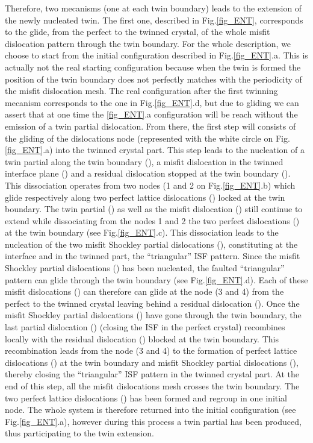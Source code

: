 \documentclass[final,3p,times,twocolumn]{elsarticle}
\begin{document}
Therefore, two mecanisms (one at each twin boundary) leads to the extension of the newly nucleated twin. The first one, described in Fig.\ref{fig_ENT}, corresponds to the glide, from the perfect to the twinned crystal, of the whole misfit dislocation pattern through the twin boundary. For the whole description, we choose to start from the initial configuration described in Fig.\ref{fig_ENT}.a. This is actually not the real starting configuration because when the twin is formed the position of the twin boundary does not perfectly matches with the periodicity of the misfit dislocation mesh. The real configuration after the first twinning mecanism corresponds to the one in Fig.\ref{fig_ENT}.d, but due to gliding we can assert that at one time the \ref{fig_ENT}.a configuration will be reach without the emission of a twin partial dislocation. From there, the first step will consists of the gliding of the dislocations node (represented with the white circle on Fig.\ref{fig_ENT}.a) into the twinned crystal part. This step leads to the nucleation of a twin partial along the twin boundary (), a misfit dislocation in the twinned interface plane () and a residual dislocation stopped at the twin boundary (). This dissociation operates from two nodes (1 and 2 on Fig.\ref{fig_ENT}.b) which glide respectively along two perfect lattice dislocations () locked at the twin boundary. The twin partial () as well as the misfit dislocation () still continue to extend while dissociating from the nodes 1 and 2 the two perfect dislocations () at the twin boundary (see Fig.\ref{fig_ENT}.c). This dissociation leads to the nucleation of the two misfit Shockley partial dislocations (), constituting at the interface and in the twinned part, the ``triangular'' ISF pattern. Since the misfit Shockley partial dislocations () has been nucleated, the faulted ``triangular'' pattern can glide through the twin boundary (see Fig.\ref{fig_ENT}.d). Each of these misfit dislocations () can therefore can glide at the node (3 and 4) from the perfect to the twinned crystal leaving behind a residual dislocation (). Once the misfit Shockley partial dislocations () have gone through the twin boundary, the last partial dislocation () (closing the ISF in the perfect crystal) recombines locally with the residual dislocation () blocked at the twin boundary. This recombination leads from the node (3 and 4) to the formation of perfect lattice dislocations () at the twin boundary and misfit Shockley partial dislocations (), thereby closing the ``triangular'' ISF pattern in the twinned crystal part. At the end of this step, all the misfit dislocations mesh crosses the twin boundary. The two perfect lattice dislocations () has been formed and regroup in one initial node. The whole system is therefore returned into the initial configuration (see Fig.\ref{fig_ENT}.a), however during this process a twin partial has been produced, thus participating to the twin extension. 
\end{document}
